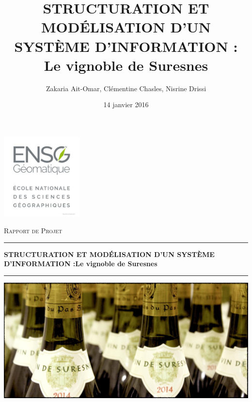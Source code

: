 \documentclass[a4paper, titlepage]{report}
\title{STRUCTURATION ET MODÉLISATION D'UN SYSTÈME D'INFORMATION : Le
vignoble de Suresnes}
\author{Zakaria Ait-Omar, Clémentine Chasles, Nisrine Drissi}
\date{14 janvier 2016}
\begin{document}
\begin{titlepage}
  \begin{sffamily}
  \begin{center}

    \includegraphics[width=4.13cm, height=4.38cm]{Images/ensg}
    
    \vskip 1.5cm

    \textsc{\Large Rapport de Projet}\\[1.5cm]

    \hrule
    
    \vskip 0.4cm
    
    { \huge \bfseries STRUCTURATION ET MODÉLISATION D'UN SYSTÈME D'INFORMATION :\newline Le vignoble de Suresnes\\[0.4cm] }

    \hrule

    \vskip 2cm
    
    \includegraphics{Images/pagecouv.jpg}
    \\[2cm]


\end{center}
\end{sffamily}
\end{titlepage}
\end{document}
